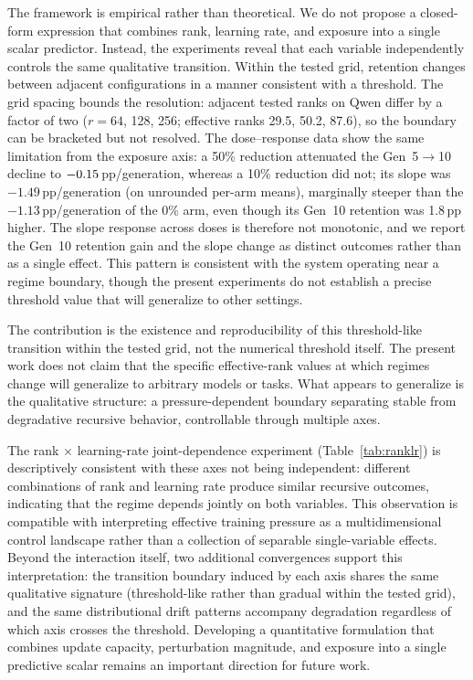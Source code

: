 \documentclass[a4paper,fleqn]{cas-dc}
\newif\ifshowchanges
\newcommand{\rev}[1]{\ifshowchanges{\color{blue}#1}\else{#1}\fi}
\begin{document}
The framework is empirical rather than theoretical. We do not propose a
closed-form expression that combines rank, learning rate, and exposure into a
single scalar predictor. Instead, the experiments reveal that each variable independently
controls the same qualitative transition. \rev{Within the tested grid, retention changes between adjacent configurations in a manner consistent with a threshold. The grid spacing bounds the resolution: adjacent tested ranks on Qwen differ by a factor of two ($r = 64$, 128, 256; effective ranks 29.5, 50.2, 87.6), so the boundary can be bracketed but not resolved. The dose--response data show the same limitation from the exposure axis: a 50\% reduction attenuated the Gen~5$\to$10 decline to $-0.15$\,pp/generation, whereas a 10\% reduction did not; its slope was $-1.49$\,pp/generation (on unrounded per-arm means), marginally steeper than the $-1.13$\,pp/generation of the 0\% arm, even though its Gen~10 retention was 1.8\,pp higher. The slope response across doses is therefore not monotonic, and we report the Gen~10 retention gain and the slope change as distinct outcomes rather than as a single effect.
\rev{This pattern is consistent with the system operating near a regime boundary, though the present experiments do not establish a precise threshold value that will generalize to other settings.}}

\rev{The contribution is the existence and reproducibility of this
{threshold-like transition within the tested grid}, not the numerical threshold itself.} The present work does not claim that the
specific effective-rank values at which regimes change will generalize to
arbitrary models or tasks. What appears to generalize is the qualitative
structure: a pressure-dependent boundary separating stable from degradative
recursive behavior, controllable through multiple axes.

The rank $\times$ learning-rate joint-dependence experiment
(Table~\ref{tab:ranklr}) \rev{is descriptively consistent with these axes not being independent}: different combinations of rank and learning rate produce similar
recursive outcomes, indicating that the regime depends jointly on both variables.
\rev{This observation is compatible with interpreting effective training pressure as a multidimensional control landscape} rather than a collection of separable
single-variable effects. Beyond the interaction itself, two additional
convergences support this interpretation:
the transition boundary induced by each axis shares the same qualitative
signature (\rev{threshold-like rather than gradual within the tested grid}), and the same distributional drift patterns
accompany degradation regardless of which axis crosses the threshold. \rev{Developing a quantitative formulation that combines update capacity, perturbation magnitude, and exposure
into a single predictive scalar remains an important direction for future work.}
\end{document}
